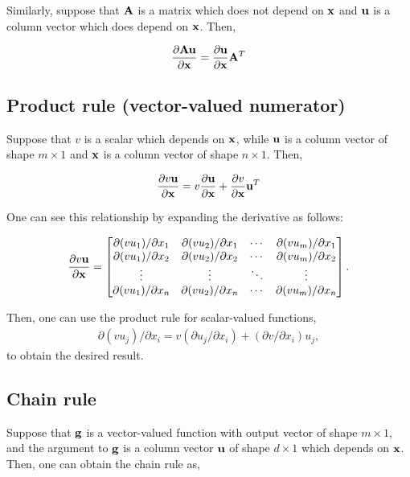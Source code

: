 Similarly, suppose that ${\bf A}$ is a matrix which does not depend on ${\bf x}$ and ${\bf u}$ is a column vector which does depend on ${\bf x}$. Then,

\begin{equation}\frac{\partial {\bf A} {\bf u}}{\partial {\bf x}} = \frac{\partial
    {\bf u}}{\partial {\bf x}}{\bf A}^T\end{equation}

\subsection{Product rule (vector-valued numerator)}

Suppose that $v$ is a scalar which depends on ${\bf x}$, while ${\bf u}$ is a column vector of shape $m\times 1$ and ${\bf x}$ is a column vector of shape $n \times 1$. Then,

\begin{equation}\frac{\partial v {\bf u}}{\partial {\bf x}} = v\frac{\partial
    {\bf u}}{\partial {\bf x}} + \frac{\partial v}{\partial {\bf x}} {\bf u}^T\end{equation}

One can see this relationship by expanding the derivative as follows:

\begin{align*}
  \frac{\partial v {\bf u}}{\partial {\bf x}} =
  \begin{bmatrix}
    \partial (v u_1)/\partial x_1 & \partial (v u_2)/\partial x_1 & \cdots & \partial (v u_m)/\partial x_1 \\
    \partial (v u_1)/\partial x_2 & \partial (v u_2)/\partial x_2 & \cdots & \partial (v u_m)/\partial x_2 \\
    \vdots                        & \vdots                        & \ddots & \vdots                        \\
    \partial (v u_1)/\partial x_n & \partial (v u_2)/\partial x_n & \cdots & \partial (v u_m)/\partial x_n \\
  \end{bmatrix}.
\end{align*}

Then, one can use the product rule for scalar-valued functions,
\begin{align*}
  \partial (v u_j)/\partial x_i = v (\partial u_j / \partial x_i) + (\partial v / \partial x_i) u_j,
\end{align*}
to obtain the desired result.

\subsection{Chain rule}
Suppose that ${\bf g}$ is a vector-valued function with output vector of shape $m \times 1$, and the argument to ${\bf g}$ is a column vector ${\bf u}$ of shape $d\times 1$ which depends on ${\bf x}$. Then, one can obtain the chain rule as,

